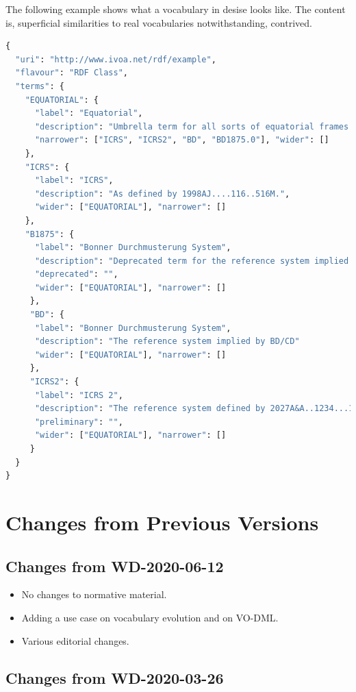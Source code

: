 \documentclass[11pt,a4paper]{ivoa}
\begin{document}
The following example shows what a vocabulary in desise looks like.  The
content is, superficial similarities to real vocabularies
notwithstanding, contrived.

\begin{lstlisting}[language=python]
{
  "uri": "http://www.ivoa.net/rdf/example",
  "flavour": "RDF Class",
  "terms": {
    "EQUATORIAL": {
      "label": "Equatorial",
      "description": "Umbrella term for all sorts of equatorial frames.",
      "narrower": ["ICRS", "ICRS2", "BD", "BD1875.0"], "wider": []
    },
    "ICRS": {
      "label": "ICRS",
      "description": "As defined by 1998AJ....116..516M.",
      "wider": ["EQUATORIAL"], "narrower": []
    },
    "B1875": {
      "label": "Bonner Durchmusterung System",
      "description": "Deprecated term for the reference system implied by BD/CD",
      "deprecated": "",
      "wider": ["EQUATORIAL"], "narrower": []
     },
     "BD": {
      "label": "Bonner Durchmusterung System",
      "description": "The reference system implied by BD/CD"
      "wider": ["EQUATORIAL"], "narrower": []
     },
     "ICRS2": {
      "label": "ICRS 2",
      "description": "The reference system defined by 2027A&A..1234...12B",
      "preliminary": "",
      "wider": ["EQUATORIAL"], "narrower": []
     }
  }
}
\end{lstlisting}

\section{Changes from Previous Versions}

\subsection{Changes from WD-2020-06-12}

\begin{itemize}
\item No changes to normative material.
\item Adding a use case on vocabulary evolution and on VO-DML.
\item Various editorial changes.
\end{itemize}

\subsection{Changes from WD-2020-03-26}
\end{document}
